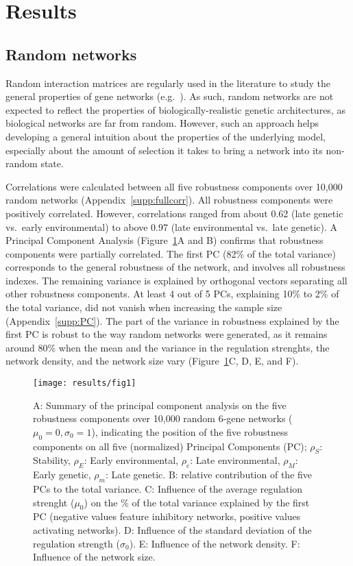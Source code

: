 \documentclass[10pt,a4paper]{article}
\newcommand{\stability}{{\rho_S}}
\newcommand{\earlyenv}{{\rho_E}}
\newcommand{\lateenv}{{\rho_e}}
\newcommand{\earlymut}{{\rho_M}}
\newcommand{\latemut}{{\rho_m}}
\newcommand{\SupMat}{Appendix~}
\begin{document}
\section{Results}

\subsection{Random networks}

Random interaction matrices are regularly used in the literature to study the general properties of gene networks (e.g.\ \cite{CTH11,PBF12}). As such, random networks are not expected to reflect the properties of biologically-realistic genetic architectures, as biological networks are far from random. However, such an approach helps developing a general intuition about the properties of the underlying model, especially about the amount of selection it takes to bring a network into its non-random state. 

Correlations were calculated between all five robustness components over 10,000 random networks (\SupMat \ref{supp:fullcorr}). All robustness components were positively correlated. However, correlations ranged from about 0.62 (late genetic vs.\ early environmental) to above 0.97 (late environmental vs.\ late genetic). A Principal Component Analysis (Figure~\ref{fig:pca}A and B) confirms that robustness components were partially correlated. The first PC (82\% of the total variance) corresponds to the general robustness of the network, and involves all robustness indexes. The remaining variance is explained by orthogonal vectors separating all other robustness components. At least 4 out of 5 PCs, explaining 10\% to 2\% of the total variance, did not vanish when increasing the sample size (\SupMat \ref{supp:PC}). The part of the variance in robustness explained by the first PC is robust to the way random networks were generated, as it remains around 80\%  when the mean and the variance in the regulation strenghts, the network density, and the network size vary (Figure~\ref{fig:pca}C, D, E, and F). 

\begin{figure}[t]
\begin{adjustwidth}{-1in}{0in}
\texttt{[image: results/fig1]}
\caption{\color{Gray} \label{fig:pca} A: Summary of the principal component analysis on the five robustness components over 10,000 random 6-gene networks ($\mu_0=0, \sigma_0=1$), indicating the position of the five robustness components on all five (normalized) Principal Components (PC); $\stability$: Stability, $\earlyenv$: Early environmental, $\lateenv$: Late environmental, $\earlymut$: Early genetic, $\latemut$: Late genetic. B: relative contribution of the five PCs to the total variance. C: Influence of the average regulation strenght ($\mu_0$) on the \% of the total variance explained by the first PC (negative values feature inhibitory networks, positive values activating networks). D: Influence of the standard deviation of the regulation strength ($\sigma_0$). E: Influence of the network density. F: Influence of the network size. }
\end{adjustwidth}
\end{figure}
\end{document}
